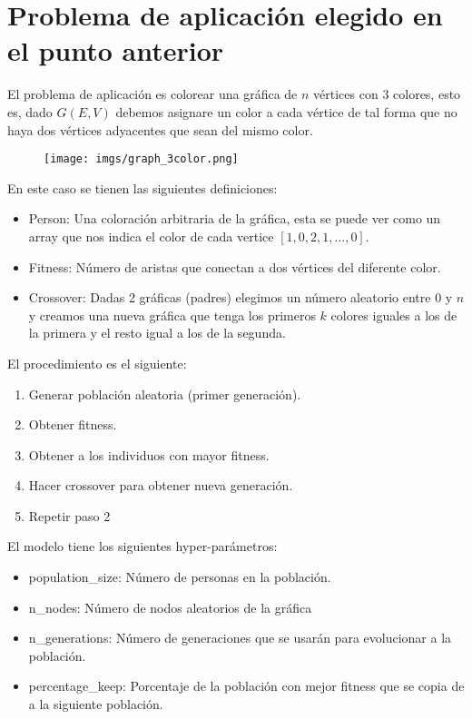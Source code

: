 \documentclass{article}
\begin{document}
\section{Problema de aplicación elegido en el punto anterior}
El problema de aplicación es colorear una gráfica de $n$ vértices con $3$ colores, esto es, dado $G(E,V)$ debemos asignare un color a cada vértice de tal forma que no haya dos vértices adyacentes que sean del mismo color.
\begin{figure}[H]
    \centering
    \texttt{[image: imgs/graph\_3color.png]}
\end{figure}
En este caso se tienen las siguientes definiciones:
\begin{itemize}
    \item Person: Una coloración arbitraria de la gráfica, esta se puede ver como un array que nos indica el color 
    de cada vertice $[1,0,2,1,...,0]$.
    \item Fitness: Número de aristas que conectan a dos vértices del diferente color.
    \item Crossover: Dadas 2 gráficas (padres) elegimos un número aleatorio entre $0$ y $n$ y creamos una nueva gráfica que tenga los primeros $k$ colores iguales a los de la primera y el resto igual a los de la segunda.
\end{itemize}
El procedimiento es el siguiente:
\begin{enumerate}
    \item Generar población aleatoria (primer generación).
    \item Obtener fitness.
    \item Obtener a los individuos con mayor fitness.
    \item Hacer crossover para obtener nueva generación.
    \item Repetir paso 2
\end{enumerate}
El modelo tiene los siguientes hyper-parámetros:
\begin{itemize}
    \item population\_size: Número de personas en la población.
    \item n\_nodes: Número de nodos aleatorios de la gráfica
    \item n\_generations: Número de generaciones que se usarán para evolucionar a la población.
    \item percentage\_keep: Porcentaje de la población con mejor fitness que se copia de a la siguiente población. 
\end{itemize}
\end{document}
